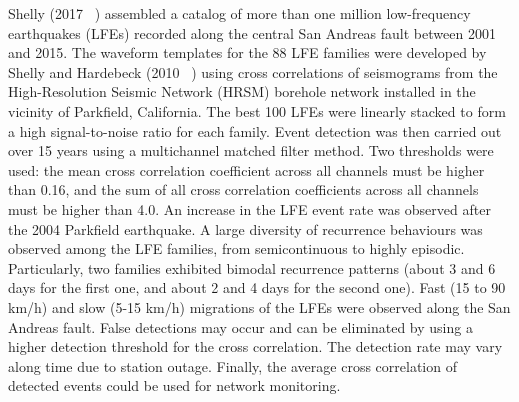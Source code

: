 \documentclass[main.tex]{subfiles}
\begin{document}
Shelly (2017 ~\cite{SHE_2017}) assembled a catalog of more than one million low-frequency earthquakes (LFEs) recorded along the central San Andreas fault between 2001 and 2015. The waveform templates for the 88 LFE families were developed by Shelly and Hardebeck (2010 ~\cite{SHE_2010}) using cross correlations of seismograms from the High-Resolution Seismic Network (HRSM) borehole network installed in the vicinity of Parkfield, California. The best 100 LFEs were linearly stacked to form a high signal-to-noise ratio for each family. Event detection was then carried out over 15 years using a multichannel matched filter method. Two thresholds were used: the mean cross correlation coefficient across all channels must be higher than 0.16, and the sum of all cross correlation coefficients across all channels must be higher than 4.0. An increase in the LFE event rate was observed after the 2004 Parkfield earthquake. A large diversity of recurrence behaviours was observed among the LFE families, from semicontinuous to highly episodic. Particularly, two families exhibited bimodal recurrence patterns (about 3 and 6 days for the first one, and about 2 and 4 days for the second one). Fast (15 to 90 km/h) and slow (5-15 km/h) migrations of the LFEs were observed along the San Andreas fault. False detections may occur and can be eliminated by using a higher detection threshold for the cross correlation. The detection rate may vary along time due to station outage. Finally, the average cross correlation of detected events could be used for network monitoring. \\
\end{document}

